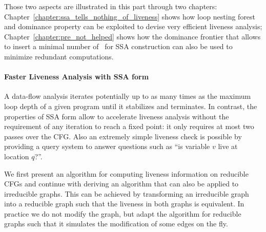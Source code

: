 Those two aspects are illustrated in this part through two chapters:
Chapter~\ref{chapter:ssa_tells_nothing_of_liveness} shows how loop
nesting forest and dominance property can be exploited to devise very
efficient liveness analysis; Chapter~\ref{chapter:pre_not_helped}
shows how the dominance frontier that allows to insert a minimal number of
\phifun\ for SSA construction can also be used to minimize redundant
computations.

\paragraph{Faster Liveness Analysis with SSA form}
A data-flow analysis iterates potentially up to as many times as the
maximum loop depth of a given program until it stabilizes and
terminates. In contrast, the properties of SSA form allow to
accelerate liveness analysis without the requirement of any iteration
to reach a fixed point: it only requires at most two passes over the
CFG. Also an extremely simple liveness check is possible by providing
a query system to answer questions such as ``is variable $v$ live at
location $q$?''.

We first present an algorithm for computing liveness information on
reducible CFGs and continue with deriving an algorithm that can also
be applied to irreducible graphs. This can be achieved by transforming
an irreducible graph into a reducible graph such that the liveness in
both graphs is equivalent. In practice we do not modify the graph, but
adapt the algorithm for reducible graphs such that it simulates the
modification of some edges on the fly.



